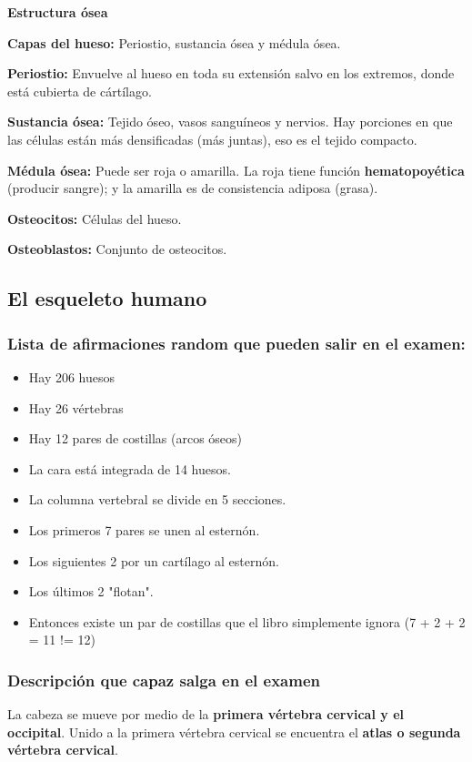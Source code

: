 \documentclass{article}
\begin{document}
\vspace{0.5cm}
\textbf{Estructura ósea}
\vspace{0.5cm}

\textbf{Capas del hueso: } Periostio, sustancia ósea y médula ósea.

\textbf{Periostio:} Envuelve al hueso en toda su extensión salvo en los extremos,
donde está cubierta de cártílago.

\textbf{Sustancia ósea:} Tejido óseo, vasos sanguíneos y nervios.
Hay porciones en que las células están más densificadas 
(más juntas), eso es el tejido compacto.

\textbf{Médula ósea:} Puede ser roja o amarilla. La roja tiene función
\textbf{hematopoyética} (producir sangre); y la amarilla es de
consistencia adiposa (grasa).


\textbf{Osteocitos:} Células del hueso.

\textbf{Osteoblastos:} Conjunto de osteocitos.

\subsection{El esqueleto humano}
\subsubsection{Lista de afirmaciones random que pueden salir en el examen:}
\begin{itemize}
  \item Hay 206 huesos
  \item Hay 26 vértebras
  \item Hay 12 pares de costillas (arcos óseos)
  \item La cara está integrada de 14 huesos.
  \item La columna vertebral se divide en 5 secciones.
  \item Los primeros 7 pares se unen al esternón.
  \item Los siguientes 2 por un cartílago al esternón.
  \item Los últimos 2 "flotan".
  \item Entonces existe un par de costillas que el libro simplemente ignora (7
    + 2 + 2 = 11 != 12)

\end{itemize}

\subsubsection{Descripción que capaz salga en el examen}
La cabeza se mueve por medio de la \textbf{primera vértebra cervical y el
occipital}. Unido a la primera vértebra cervical se encuentra el
\textbf{atlas o segunda vértebra cervical}.
\end{document}
